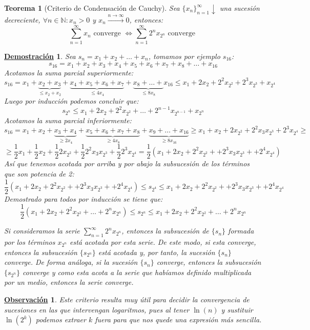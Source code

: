 \documentclass[10pt,a4paper,openright]{book}
\theoremstyle{break}
\newtheorem{theo}{Teorema}[chapter]
\newtheorem*{demo}{\underline{Demostración}}
\newtheorem{obs}{\underline{Observación}}[chapter]
\begin{document}
\begin{theo}[Criterio de Condensación de Cauchy]
Sea $\{x_n\}_{n=1}^\infty \downarrow$ una sucesión decreciente, $\forall n \in  \mathbb{N} : x_n > 0$ y $x_n \xrightarrow{n\rightarrow \infty} 0$, entonces:
$$\sum_{n=1}^{\infty} x_n \mbox{ converge } \Leftrightarrow \sum_{n=1}^{\infty} 2^n x_{2^n} \mbox{ converge }$$
\end{theo}
\begin{demo}
Sea $s_n = x_1 + x_2 + \ldots + x_n$, tomamos por ejemplo $s_{16}$:
$$s_{16} = x_1 + x_2 + x_3 + x_4 + x_5 + x_6 + x_7 + x_8 + \ldots + x_{16}$$
Acotamos la suma parcial superiormente:
$$s_{16} = x_1 + \underbrace{x_2 + x_3}_{ \leq x_2 + x_2} + \underbrace{x_4 + x_5 + x_6 + x_7}_{\leq 4x_4} + \underbrace{x_8 + \ldots +}_{\leq 8x_8} x_{16} \leq x_1 + 2x_2 + 2^2 x_{2^2} + 2^3 x_{2^3} + x_{2^4}$$
Luego por inducción podemos concluir que:
$$s_{2^n} \leq x_1 + 2x_2 + 2^2 x_{2^2} + \ldots + 2^{n-1} x_{2^{n-1}}+ x_{2^n}$$
Acotamos la suma parcial inferiormente:
$$s_{16} = x_1 + x_2 +\underbrace{ x_3 + x_4}_{\geq 2x_4} + \underbrace{ x_5 + x_6 + x_7 + x_8}_{\geq 4x_8} + \underbrace{ x_9 + \ldots + x_{16}}_{\geq 8x_{16}}\geq x_1 + x_2 + 2 x_{2^2} + 2^2 x_3 x_{2^3} +  2^3 x_{2^4} \geq$$
$$\geq \frac{1}{2}  x_1 + \frac{1}{2} x_2 + \frac{1}{2} 2 x_{2^2} + \frac{1}{2} 2^2 x_3 x_{2^3} + \frac{1}{2} 2^3 x_{2^4} =\frac{1}{2} (x_1 + 2x_2 + 2^2 x_{2^2} + + 2^3 x_3 x_{2^3} + + 2^4 x_{2^4})$$
Así que tenemos acotada por arriba y por abajo la subsucesión de los términos que son potencia de 2:
$$\frac{1}{2} (x_1 + 2x_2 + 2^2 x_{2^2} + + 2^3 x_3 x_{2^3} + + 2^4 x_{2^4}) \leq s_{2^4} \leq x_1 + 2x_2 + 2^2 x_{2^2} + + 2^3 x_3 x_{2^3} + + 2^4 x_{2^4}$$
Demostrado para todos por inducción se tiene que:
$$\frac{1}{2} (x_1 + 2x_2 + 2^2 x_{2^2} + \ldots + 2^n x_{2^n}) \leq s_{2^n} \leq x_1 + 2x_2 + 2^2 x_{2^2} + \ldots + 2^n x_{2^n}$$

Si consideramos la serie $ \sum_{n=1}^{\infty} 2^n x_{2^n} $, entonces la subsucesión de $\{s_n\}$ formada por los términos $x_{2^n}$ está acotada por 
esta serie. De este modo, si esta converge, entonces la subsucesión $\{s_{2^n}\}$ está acotada y, por tanto, la sucesión $\{s_n\}$ converge. De forma análoga, si la sucesión $\{s_n\}$ converge, entonces la subsucesión $\{s_{2^n}\}$ converge y como esta acota a la serie que habíamos definido multiplicada por un medio, entonces la serie converge.
\end{demo}

\begin{obs}
Este criterio resulta muy útil para decidir la convergencia de sucesiones en las que intervengan logaritmos, pues al tener $\ln (n)$ y sustituir $\ln (2^k)$ podemos extraer $k$ fuera para que nos quede una expresión más sencilla.
\end{obs}
\end{document}
